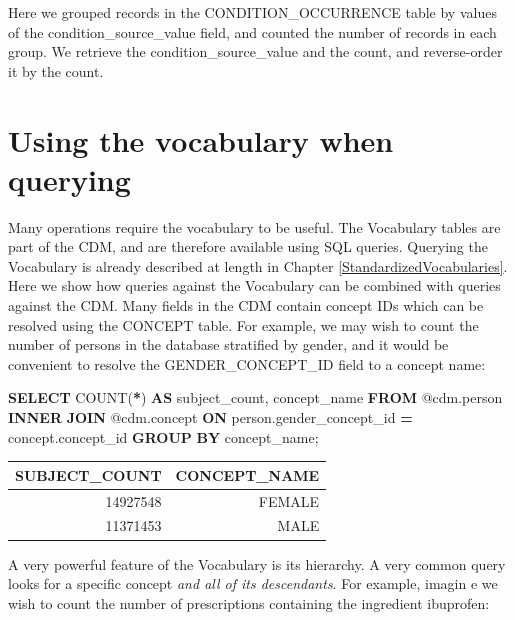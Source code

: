 \documentclass[11pt]{book}
\newenvironment{Shaded}{\begin{snugshade}}{\end{snugshade}}
\newcommand{\FunctionTok}[1]{\textcolor[rgb]{0.00,0.00,0.00}{#1}}
\newcommand{\KeywordTok}[1]{\textcolor[rgb]{0.13,0.29,0.53}{\textbf{#1}}}
\newcommand{\NormalTok}[1]{#1}
\newcommand{\OperatorTok}[1]{\textcolor[rgb]{0.81,0.36,0.00}{\textbf{#1}}}
\theoremstyle{definition}
\theoremstyle{definition}
\theoremstyle{definition}
\theoremstyle{remark}
\begin{document}
Here we grouped records in the CONDITION\_OCCURRENCE table by values of the condition\_source\_value field, and counted the number of records in each group. We retrieve the condition\_source\_value and the count, and reverse-order it by the count.

\hypertarget{using-the-vocabulary-when-querying}{%
\section{Using the vocabulary when querying}\label{using-the-vocabulary-when-querying}}

Many operations require the vocabulary to be useful. The Vocabulary tables are part of the CDM, and are therefore available using SQL queries. Querying the Vocabulary is already described at length in Chapter \ref{StandardizedVocabularies}. Here we show how queries against the Vocabulary can be combined with queries against the CDM. Many fields in the CDM contain concept IDs which can be resolved using the CONCEPT table. For example, we may wish to count the number of persons in the database stratified by gender, and it would be convenient to resolve the GENDER\_CONCEPT\_ID field to a concept name:

\begin{Shaded}
\begin{Highlighting}[]
\KeywordTok{SELECT} \FunctionTok{COUNT}\NormalTok{(}\OperatorTok{*}\NormalTok{) }\KeywordTok{AS}\NormalTok{ subject_count,}
\NormalTok{  concept_name}
\KeywordTok{FROM}\NormalTok{ @cdm.person}
\KeywordTok{INNER} \KeywordTok{JOIN}\NormalTok{ @cdm.concept}
  \KeywordTok{ON}\NormalTok{ person.gender_concept_id }\OperatorTok{=}\NormalTok{ concept.concept_id}
\KeywordTok{GROUP} \KeywordTok{BY}\NormalTok{ concept_name;}
\end{Highlighting}
\end{Shaded}

\begin{longtable}[]{@{}rr@{}}
\toprule
SUBJECT\_COUNT & CONCEPT\_NAME\tabularnewline
\midrule
\endhead
14927548 & FEMALE\tabularnewline
11371453 & MALE\tabularnewline
\bottomrule
\end{longtable}

A very powerful feature of the Vocabulary is its hierarchy. A very common query looks for a specific concept \emph{and all of its descendants}. For example, imagin e we wish to count the number of prescriptions containing the ingredient ibuprofen:
\end{document}
